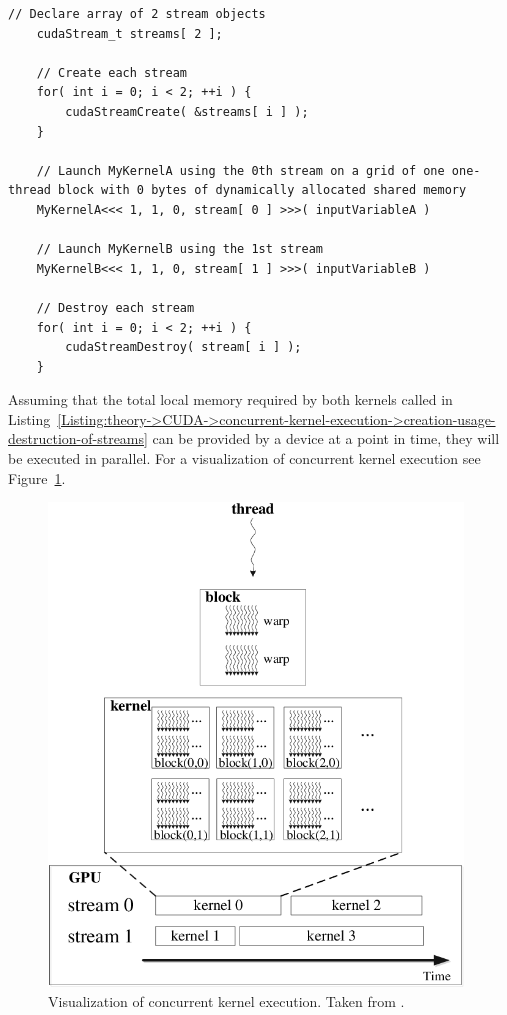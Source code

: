 \begin{lstlisting}[caption={C++ pseudocode showcasing the creation, usage, and destruction of two streams.
Taken from \citetitle{NVIDIADecember2022} \cite{NVIDIADecember2022}.},label={Listing:theory->CUDA->concurrent-kernel-execution->creation-usage-destruction-of-streams}]
	// Declare array of 2 stream objects
	cudaStream_t streams[ 2 ];
	
	// Create each stream
	for( int i = 0; i < 2; ++i ) {
		cudaStreamCreate( &streams[ i ] );
	}
	
	// Launch MyKernelA using the 0th stream on a grid of one one-thread block with 0 bytes of dynamically allocated shared memory
	MyKernelA<<< 1, 1, 0, stream[ 0 ] >>>( inputVariableA )
	
	// Launch MyKernelB using the 1st stream
	MyKernelB<<< 1, 1, 0, stream[ 1 ] >>>( inputVariableB )
	
	// Destroy each stream
	for( int i = 0; i < 2; ++i ) {
		cudaStreamDestroy( stream[ i ] );
	}
\end{lstlisting}

Assuming that the total local memory required by both kernels called in Listing~\ref{Listing:theory->CUDA->concurrent-kernel-execution->creation-usage-destruction-of-streams} can be provided by a device at a point in time, they will be executed in parallel.
For a visualization of concurrent kernel execution see Figure~\ref{Figure:theory->CUDA->concurrent-kernel-execution->concurrent-kernel-execution-visualization}.

\begin{figure}[ht!]
	\centering
	\includegraphics[width=11cm, keepaspectratio]{images/ch01/CUDA_concurrent_kernel_execution.png}
	\caption{Visualization of concurrent kernel execution.
		Taken from  \cite{Xu2015}.
	}
	\label{Figure:theory->CUDA->concurrent-kernel-execution->concurrent-kernel-execution-visualization}
\end{figure}


